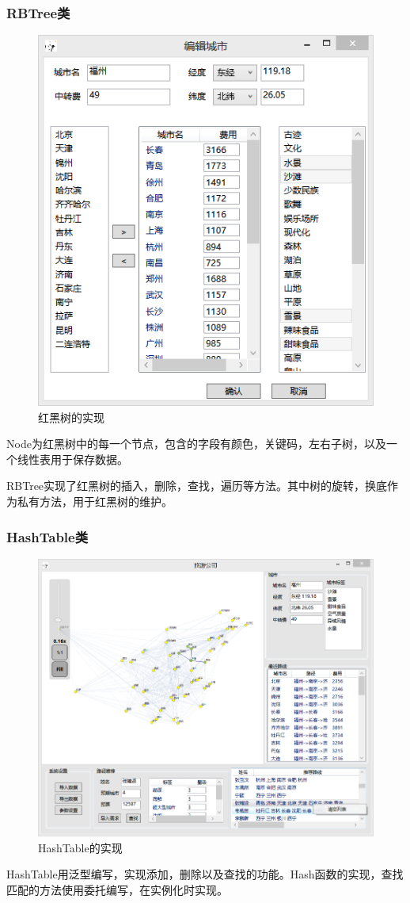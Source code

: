 \documentclass[12pt,a4paper]{article}
\begin{document}
\subsubsection{RBTree类}
\begin{figure}[H]
\centering
\includegraphics[scale = 1]{4.png}
\caption{红黑树的实现} 
\end{figure}
Node为红黑树中的每一个节点，包含的字段有颜色，关键码，左右子树，以及一个线性表用于保存数据。\par
RBTree实现了红黑树的插入，删除，查找，遍历等方法。其中树的旋转，换底作为私有方法，用于红黑树的维护。
\subsubsection{HashTable类}
\begin{figure}[H]
\centering
\includegraphics[scale = 1]{5.png}
\caption{HashTable的实现} 
\end{figure}
HashTable用泛型编写，实现添加，删除以及查找的功能。Hash函数的实现，查找匹配的方法使用委托编写，在实例化时实现。
\end{document}
